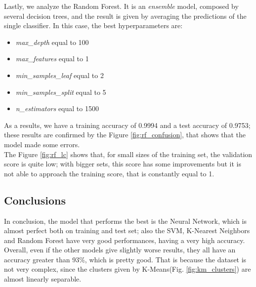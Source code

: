 Lastly, we analyze the Random Forest. It is an \emph{ensemble} model, composed by several decision trees, and the result is given by averaging the predictions of the single classifier.
In this case, the best hyperparameters are:
\begin{itemize}
\item \emph{max\_depth} equal to 100
\item \emph{max\_features} equal to 1
\item \emph{min\_samples\_leaf} equal to 2
\item \emph{min\_samples\_split} equal to 5
\item \emph{n\_estimators} equal to 1500
\end{itemize}
As a results, we have a training accuracy of 0.9994 and a test accuracy of 0.9753; these results are confirmed by the Figure \ref{fig:rf_confusion}, that shows that the model made some errors.\\
The Figure \ref{fig:rf_lc} shows that, for small sizes of the training set, the validation score is quite low; with bigger sets, this score has some improvements but it is not able to approach the training score, that is constantly equal to 1.

\subsection{Conclusions}
In conclusion, the model that performs the best is the Neural Network, which is almost perfect both on training and test set; also the SVM, K-Nearest Neighbors and Random Forest have very good performances, having a very high accuracy.\\
Overall, even if the other models give slightly worse results, they all have an accuracy greater than 93\%, which is pretty good. That is because the dataset is not very complex, since the clusters given by K-Means(Fig. \ref{fig:km_clusters}) are almost linearly separable.
